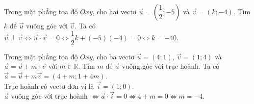 
\begin{bt}%
	Trong mặt phẳng tọa độ $Oxy$, cho hai vectơ $\overrightarrow{u}=\left (\dfrac{1}{2};-5 \right )$ và $\overrightarrow{v}=\left (k;-4 \right )$. Tìm $k$ để $\overrightarrow{u}$ vuông góc với $\overrightarrow{v}$.
	\loigiai
	{
		Ta có $\overrightarrow{u}\perp\overrightarrow{v}\Leftrightarrow\overrightarrow{u}\cdot\overrightarrow{v}=0\Leftrightarrow \dfrac{1}{2}k+(-5)(-4)=0\Leftrightarrow k=-40.$
	}
\end{bt}

\begin{bt}%
	Trong mặt phẳng tọa độ $Oxy$, cho ba vectơ $\overrightarrow{u}=(4;1)$, $\overrightarrow{v}=(1;4)$ và $\overrightarrow{a}=\overrightarrow{u}+m\cdot\overrightarrow{v}$ với $m\in\mathbb{R}$. Tìm $m$ để $\overrightarrow{a}$ vuông góc với trục hoành.
	\loigiai
	{
		Ta có $\overrightarrow{a}=\overrightarrow{u}+m\overrightarrow{v}=\left (4+m;1+4m \right )$.\\
		Trục hoành có vectơ đơn vị là $\overrightarrow{i}=(1;0)$.\\
		$\overrightarrow{a}$ vuông góc với trục hoành $\Leftrightarrow \overrightarrow{a}\cdot\overrightarrow{i}=0\Leftrightarrow 4+m=0\Leftrightarrow m=-4$.
	}
\end{bt}

